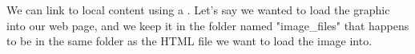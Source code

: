 We can link to local content using a . Let's say 
we wanted to load the graphic  into our web page, and 
we keep it in the folder named "image\_files" that happens to be in 
the same folder as the HTML file we want to load the image into.
